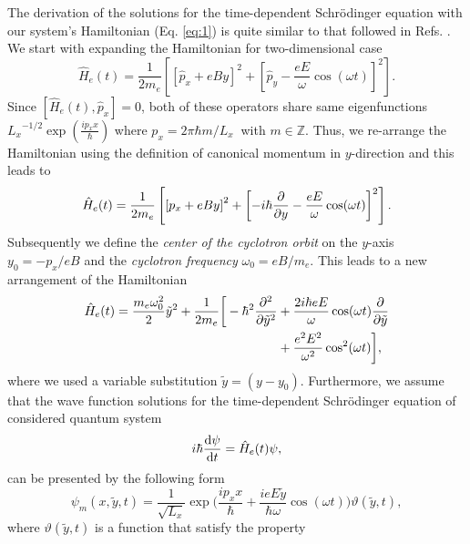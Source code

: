 The derivation of the solutions for the time-dependent Schrödinger equation with our system's Hamiltonian (Eq. \ref{eq:1}) is quite similar to that followed in Refs. \cite{husimi53,dini16}. We start with expanding the Hamiltonian for two-dimensional case
\begin{equation} \label{eq:a1}
  \hat{H}_e(t) = \frac{1}{2m_e}\left[
    \left[\hat{p}_x + eBy \right]^2 +
    \left[\hat{p}_y - \frac{eE}{\omega}\cos(\omega t)\right]^2
  \right].
\end{equation}
Since $\left[\hat{H}_e(t),\hat{p}_x \right] =0$, both of these operators share same eigenfunctions
${L_x}^{-1/2}\exp(\frac{ip_x x}{\hbar})$ where $p_x = 2\pi \hbar m/L_x~$ with $ m \in \mathbb{Z}$.
Thus, we re-arrange the Hamiltonian using the definition of canonical momentum in $y$-direction and this leads to
\begin{equation} \label{eq:a2}
    \hat{H}_e(t) = \frac{1}{2m_e}\left[
      \left[{p}_x + eBy \right]^2 +
      \left[-i\hbar \pdv{y}- \frac{eE}{\omega}\cos(\omega t)\right]^2
    \right].
\end{equation}
Subsequently we define the \textit{center of the cyclotron orbit} on the $y$-axis $y_0 = {-p_x}/{eB}$ and the \textit{cyclotron frequency} $\omega_0 = {eB}/{m_e}$. This leads to a new arrangement of the Hamiltonian
\begin{equation} \label{eq:a3}
  \begin{aligned}
    \hat{H}_e(t) =
      \frac{m_e \omega_0^2}{2}\tilde{y}^2 +
      \frac{1}{2m_e}\bigg[
      -\hbar^2 \pdv[2]{\tilde{y}} & +
      \frac{2i\hbar eE}{\omega}\cos(\omega t) \pdv{\tilde{y}} \\
      & +
      \frac{e^2E^2}{\omega^2}\cos[2](\omega t)
      \bigg],
  \end{aligned}
\end{equation}
where we used a variable substitution $\tilde{y} = (y - y_0)$. Furthermore, we assume that the wave function solutions for the time-dependent Schrödinger equation of considered quantum system
\begin{equation} \label{eq:a4}
    i \hbar \dv{\psi}{t} = \hat{H}_e(t)\psi,
\end{equation}
can be presented by the following form
\begin{equation} \label{eq:a5}
    \psi_m(x,\tilde{y},t) = \frac{1}{\sqrt{L_x}} \exp\bigg(
      \frac{ip_x x}{\hbar} +
      \frac{ieE\tilde{y}}{\hbar \omega}\cos(\omega t)
    \bigg) \vartheta(\tilde{y},t),
\end{equation}
where $\vartheta(\tilde{y},t)$ is a function that satisfy the property
